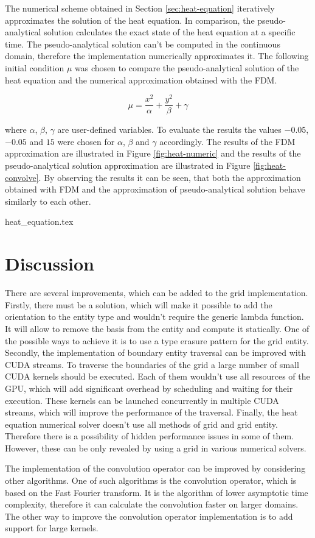 The numerical scheme obtained in Section \ref{sec:heat-equation} iteratively approximates the solution of the heat equation.
In comparison, the pseudo-analytical solution calculates the exact state of the heat equation at a specific time.
The pseudo-analytical solution can't be computed in the continuous domain, therefore the implementation numerically approximates it.
The following initial condition \(\mu\) was chosen to compare the pseudo-analytical solution of the heat equation and the numerical approximation obtained with the FDM.

\begin{equation}
 \mu = \frac{x^2}{\alpha} + \frac{y^2}{\beta} + \gamma
\end{equation}

where \(\alpha\), \(\beta\), \(\gamma\) are user-defined variables.
To evaluate the results the values \(-0.05\), \(-0.05\) and \(15\) were chosen for \(\alpha\), \(\beta\) and \(\gamma\) accordingly.
The results of the FDM approximation are illustrated in Figure \ref{fig:heat-numeric} and the results of the pseudo-analytical solution approximation are illustrated in Figure \ref{fig:heat-convolve}.
By observing the results it can be seen, that both the approximation obtained with FDM and the approximation of pseudo-analytical solution behave similarly to each other.

{heat_equation.tex}

\newpage
\section{Discussion}

There are several improvements, which can be added to the grid implementation.
Firstly, there must be a solution, which will make it possible to add the orientation to the entity type and wouldn't require the generic lambda function.
It will allow to remove the basis from the entity and compute it statically.
One of the possible ways to achieve it is to use a type erasure pattern \cite{TypeErasure} for the grid entity.
Secondly, the implementation of boundary entity traversal can be improved with CUDA streams.
To traverse the boundaries of the grid a large number of small CUDA kernels should be executed.
Each of them wouldn't use all resources of the GPU, which will add significant overhead by scheduling and waiting for their execution.
These kernels can be launched concurrently in multiple CUDA streams, which will improve the performance of the traversal.
Finally, the heat equation numerical solver doesn't use all methods of grid and grid entity.
Therefore there is a possibility of hidden performance issues in some of them.
However, these can be only revealed by using a grid in various numerical solvers.

The implementation of the convolution operator can be improved by considering other algorithms.
One of such algorithms is the convolution operator, which is based on the Fast Fourier transform.
It is the algorithm of lower asymptotic time complexity, therefore it can calculate the convolution faster on larger domains.
The other way to improve the convolution operator implementation is to add support for large kernels.